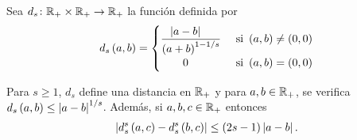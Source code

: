 Sea $d_{s}\colon\mathbb{R}_{+}\times\mathbb{R}_{+}\to\mathbb{R}_{+}$ la función definida por
\begin{align*}
d_{s}\left( a,b \right) = 
\begin{cases}
\dfrac{\left| a - b \right|\ \ \ }{\left( a + b \right)^{1-1/s}} & \text{ si } \left( a,b \right) \ne \left( 0,0 \right) \\
\qquad 0 &  \text{ si } \left( a,b \right) = \left( 0,0 \right)
\end{cases}
\end{align*}

\begin{lemma}
	Para $s\ge 1$, $d_{s}$ define una distancia en $\mathbb{R}_{+}$ y para $a,b\in\mathbb{R}_{+}$, se verifica $d_{s}\left( a,b \right) \le \left| a-b \right|^{1/s}$.
	Además, si $a,b,c\in\mathbb{R}_{+}$ entonces
	\begin{align*}
	\left| d_{s}^{s}\left( a,c \right)-d_{s}^{s}\left( b,c \right) \right| \le \left( 2s-1 \right)\left| a-b \right|.
	\end{align*}
\end{lemma}


